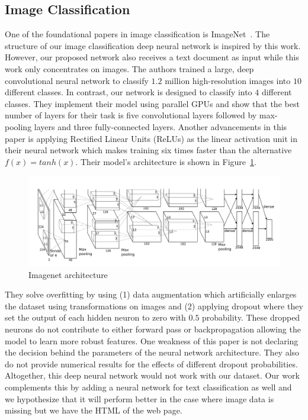 \documentclass{article} %
\begin{document}
\subsection{Image Classification}
One of the foundational papers in image classification is ImageNet~\cite{imagehinton}. The structure of our image classification deep neural network is inspired by this work. However, our proposed network also receives a text document as input while this work only concentrates on images.
The authors trained a large, deep convolutional neural network to classify $1.2$ million high-resolution images into $10$ different classes. In contrast, our network is designed to classify into $4$ different classes.
They implement their model using parallel GPUs and show that the best number of layers for their task is five convolutional layers followed by max-pooling layers and three fully-connected layers. Another advancements in this paper is applying Rectified Linear Units (ReLUs) as the linear activation unit in their neural network which makes training six times faster than the alternative $f(x) = tanh(x)$. Their model's architecture is shown in Figure~\ref{fig:imagenet}.
\begin{figure}
\centering
        \includegraphics[totalheight=5cm]{imagenet.png}
    \caption{Imagenet architecture \protect\cite{imagehinton}}
    \label{fig:imagenet}
\end{figure}
They solve overfitting by using (1) data augmentation which artificially enlarges the dataset using transformations on images and (2) applying dropout where they set the output of each hidden neuron to zero with $0.5$ probability. These dropped neurons do not contribute to either forward pass or backpropagation allowing the model to learn more robust features.
One weakness of this paper is not declaring the decision behind the parameters of the neural network architecture. They also do not provide numerical results for the effects of different dropout probabilities. Altogether, this deep neural network would not work with our dataset. Our work complements this by adding a neural network for text classification as well and we hypothesize that it will perform better in the case where image data is missing but we have the HTML of the web page.
\end{document}
